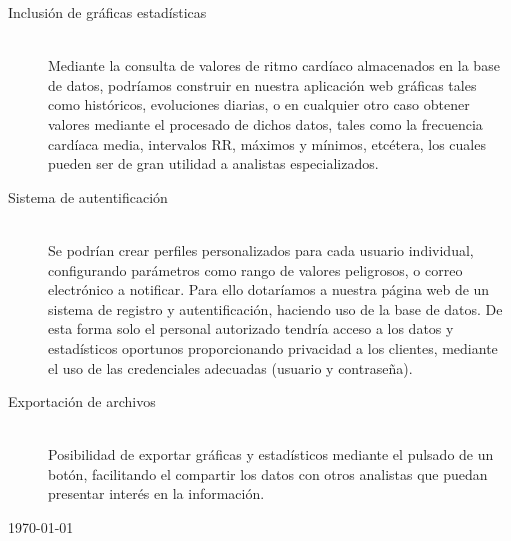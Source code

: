 \begin{description}
    \item[Inclusión de gráficas estadísticas]\hfill \\	
    Mediante la consulta de valores de ritmo cardíaco almacenados en la base de datos, podríamos construir en nuestra aplicación web gráficas tales como históricos, evoluciones diarias, o en cualquier otro caso obtener valores mediante el procesado de dichos datos, tales como la frecuencia cardíaca media, intervalos RR, máximos y mínimos, etcétera, los cuales pueden ser de gran utilidad a analistas especializados.
    
    \item[Sistema de autentificación]\hfill \\
    Se podrían crear perfiles personalizados para cada usuario individual, configurando parámetros como rango de valores peligrosos, o correo electrónico a notificar. Para ello dotaríamos a nuestra página web de un sistema de registro y autentificación, haciendo uso de la base de datos. De esta forma solo el personal autorizado tendría acceso a los datos y estadísticos oportunos proporcionando privacidad a los clientes, mediante el uso de las credenciales adecuadas (usuario y contraseña).
    
    \item[Exportación de archivos]\hfill\\
    Posibilidad de exportar gráficas y estadísticos mediante el pulsado de un botón, facilitando el compartir los datos con otros analistas que puedan presentar interés en la información.
    
    
\end{description}

\begin{flushright}
{\large \pfcauthorname}\nli
\today
\end{flushright}
	
\chapterend{}